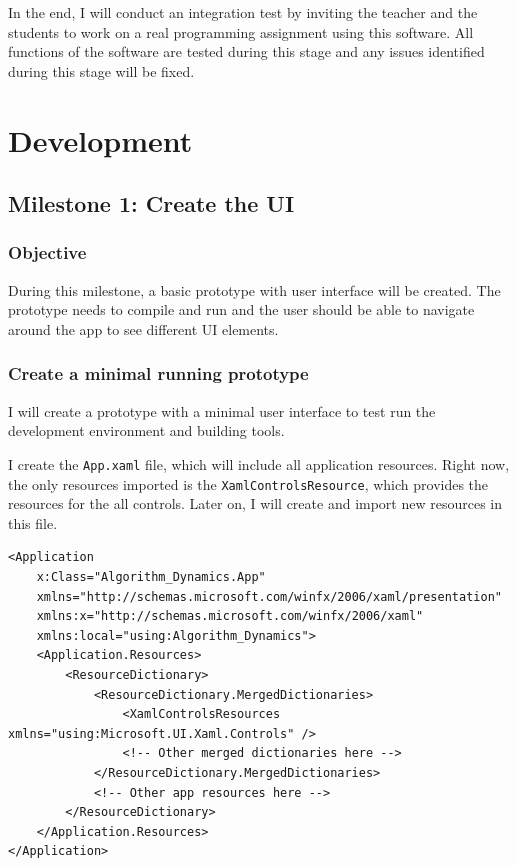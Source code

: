 \documentclass[a4paper]{report}
\begin{document}
In the end, I will conduct an integration test by inviting the teacher and the students to work on a real programming assignment using this software. All functions of the software are tested during this stage and any issues identified during this stage will be fixed.

\chapter{Development}

\section{Milestone 1: Create the UI}

\subsection{Objective}

During this milestone, a basic prototype with user interface will be created. The prototype needs to compile and run and the user should be able to navigate around the app to see different UI elements.

\subsection{Create a minimal running prototype}

I will create a prototype with a minimal user interface to test run the development environment and building tools.\cite{microsoft:docs:create-your-first-winui3-app}

I create the \texttt{App.xaml} file, which will include all application resources. Right now, the only resources imported is the \texttt{XamlControlsResource}, which provides the resources for the all controls. Later on, I will create and import new resources in this file.

\begin{verbatim}
<Application
    x:Class="Algorithm_Dynamics.App"
    xmlns="http://schemas.microsoft.com/winfx/2006/xaml/presentation"
    xmlns:x="http://schemas.microsoft.com/winfx/2006/xaml"
    xmlns:local="using:Algorithm_Dynamics">
    <Application.Resources>
        <ResourceDictionary>
            <ResourceDictionary.MergedDictionaries>
                <XamlControlsResources xmlns="using:Microsoft.UI.Xaml.Controls" />
                <!-- Other merged dictionaries here -->
            </ResourceDictionary.MergedDictionaries>
            <!-- Other app resources here -->
        </ResourceDictionary>
    </Application.Resources>
</Application>
\end{verbatim}
\end{document}
